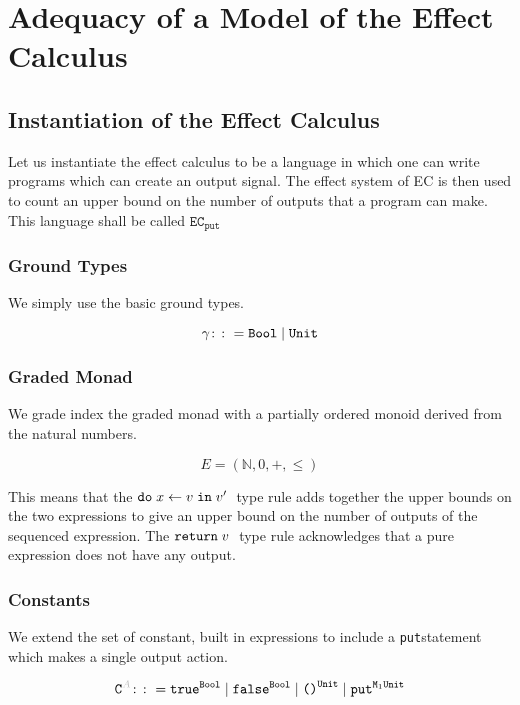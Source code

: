 \documentclass{Report}
\newcommand{\N}[0]{\mathbb{N}}
\renewcommand\put[0]{\texttt{put}}
\newcommand\ecput[0]{\texttt{EC}_\put}
\begin{document}
\chapter{Adequacy of a Model of the Effect Calculus}
    \section{Instantiation of the Effect Calculus}
    Let us instantiate the effect calculus to be a language in which one can write programs which can create an output signal. The effect system of EC is then used to count an upper bound on the number of outputs that a program can make. This language shall be called $\ecput$

    \subsection{Ground Types}
    We simply use the basic ground types.

    \begin{equation}
        \label{AdequacyGroundTypes}
        \gamma \colon\colon= \texttt{Bool} \mid \texttt{Unit}
    \end{equation}

    \subsection{Graded Monad}
    We grade index the graded monad with a partially ordered monoid derived from the natural numbers.

    \begin{equation}
        E = (\N, 0, +, \leq)        
    \end{equation}

    This means that the $\texttt{do}\; x \leftarrow v \;\texttt{in}\; v'\;$ type rule adds together the upper bounds on the two expressions to give an upper bound on the number of outputs of the sequenced expression. The $\texttt{return} \; v\;$ type rule acknowledges that a pure expression does not have any output.

    \subsection{Constants}
    We extend the set of constant, built in expressions to include a \put\s statement which makes a single output action.

    \begin{equation}
        \label{AdequacyConstants}
        \const{A} \gens \t^\B \mid \f^\B \mid \u^\U \mid \put^{\M{1}{\U}}        
    \end{equation}
\end{document}
